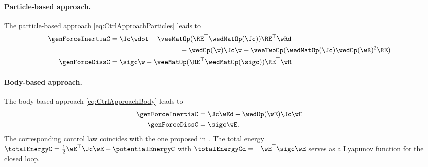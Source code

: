 \paragraph{Particle-based approach.}
The particle-based approach \eqref{eq:CtrlApproachParticles} leads to
\begin{subequations}
\begin{align}
 \genForceInertiaC &= \Jc \wdot - \veeMatOp(\RE^\top \wedMatOp(\Jc)) \RE^\top \wRd
\nonumber\\
 &\hspace{10em}
 + \wedOp(\w) \Jc \w + \veeTwoOp(\wedMatOp(\Jc)\wedOp(\wR)^2\RE)
\\
 \genForceDissC &= \sigc \w - \veeMatOp(\RE^\top \wedMatOp(\sigc)) \RE^\top \wR
\end{align} 
\end{subequations}

\paragraph{Body-based approach.}
The body-based approach \eqref{eq:CtrlApproachBody} leads to 
\begin{subequations}
\begin{align}
 \genForceInertiaC &= \Jc \wEd + \wedOp(\wE) \Jc \wE
\\
 \genForceDissC &= \sigc \wE.
\end{align} 
\end{subequations}
The corresponding control law coincides with the one proposed in \cite{Koditschek:TotalEnergy}.
The total energy $\totalEnergyC = \tfrac{1}{2} \wE^\top \Jc \wE + \potentialEnergyC$ with $\totalEnergyCd = -\wE^\top \sigc \wE$ serves as a Lyapunov function for the closed loop.

